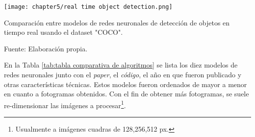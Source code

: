 \begin{myfigure}[H]
	\footnotesize\centering
	\texttt{[image: chapter5/real time object detection.png]}
	\caption{Comparación entre modelos de redes neuronales de detección de objetos en tiempo real usando el dataset "COCO".}
	\begin{myflushcenter}
		Fuente: Elaboración propia.
	\end{myflushcenter}
	\label{fig:real time object detection}
\end{myfigure}

En la Tabla \ref{tab:tabla comparativa de algoritmos} se lista los diez modelos de redes neuronales junto con el \textit{paper}, el \textit{código}, el año en que fueron publicado y otras características técnicas. Estos modelos fueron ordenados de mayor a menor en cuanto a fotogramas obtenidos. Con el fin de obtener más fotogramas, se suele re-dimensionar las imágenes a procesar\footnote{Usualmente a imágenes cuadras de  128,256,512 px.}.

